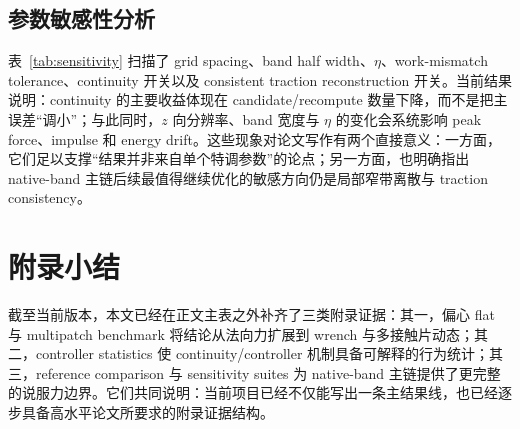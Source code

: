 \documentclass[11pt,a4paper]{ctexart}
\begin{document}


\subsection{参数敏感性分析}
表~\ref{tab:sensitivity} 扫描了 grid spacing、band half width、$\eta$、work-mismatch tolerance、continuity 开关以及 consistent traction reconstruction 开关。当前结果说明：continuity 的主要收益体现在 candidate/recompute 数量下降，而不是把主误差“调小”；与此同时，$z$ 向分辨率、band 宽度与 $\eta$ 的变化会系统影响 peak force、impulse 和 energy drift。这些现象对论文写作有两个直接意义：一方面，它们足以支撑“结果并非来自单个特调参数”的论点；另一方面，也明确指出 native-band 主链后续最值得继续优化的敏感方向仍是局部窄带离散与 traction consistency。



\section{附录小结}
截至当前版本，本文已经在正文主表之外补齐了三类附录证据：其一，偏心 flat 与 multipatch benchmark 将结论从法向力扩展到 wrench 与多接触片动态；其二，controller statistics 使 continuity/controller 机制具备可解释的行为统计；其三，reference comparison 与 sensitivity suites 为 native-band 主链提供了更完整的说服力边界。它们共同说明：当前项目已经不仅能写出一条主结果线，也已经逐步具备高水平论文所要求的附录证据结构。
\end{document}
